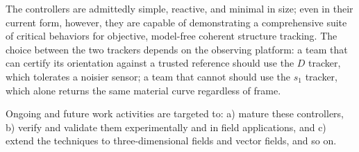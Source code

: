 \documentclass[lettersize,journal]{IEEEtran}
\begin{document}
The controllers are admittedly simple, reactive, and minimal in size; even in their current form, however, they are capable of demonstrating a comprehensive suite of critical behaviors for objective, model-free coherent structure tracking. The choice between the two trackers depends on the observing platform: a team that can certify its orientation against a trusted reference should use the $D$ tracker, which tolerates a noisier sensor; a team that cannot should use the $s_1$ tracker, which alone returns the same material curve regardless of frame. 

Ongoing and future work activities are targeted to: a) mature these controllers, b) verify and validate them experimentally and in field applications, and c) extend the techniques to three-dimensional fields and vector fields, and so on.
\end{document}
